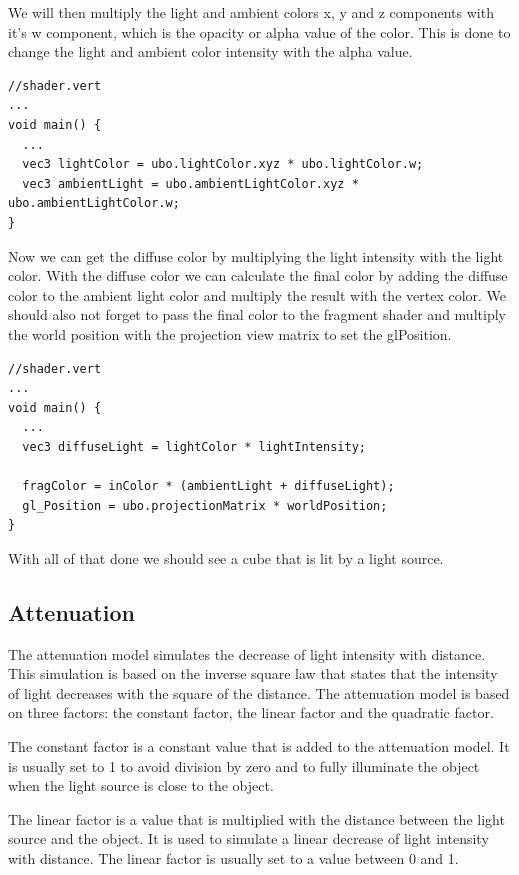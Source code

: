 \documentclass[12pt]{report} \usepackage{preamble}
\begin{document}
We will then multiply the light and ambient colors x, y and z components with it's w component, which is the
opacity or alpha value of the color. This is done to change the light and ambient color intensity with the alpha value.

\begin{lstlisting}[Language=C++]
//shader.vert
...
void main() {
  ...
  vec3 lightColor = ubo.lightColor.xyz * ubo.lightColor.w;
  vec3 ambientLight = ubo.ambientLightColor.xyz * ubo.ambientLightColor.w;
}
\end{lstlisting}

Now we can get the diffuse color by multiplying the light intensity with the light color.
With the diffuse color we can calculate the final color by adding the diffuse color to the ambient light color and multiply the result with the vertex color.
We should also not forget to pass the final color to the fragment shader and multiply the world position with the projection view matrix
to set the gl\textunderscore Position.

\begin{lstlisting}[Language=C++]
//shader.vert
...
void main() {
  ...
  vec3 diffuseLight = lightColor * lightIntensity;

  fragColor = inColor * (ambientLight + diffuseLight);
  gl_Position = ubo.projectionMatrix * worldPosition;
}
\end{lstlisting}

With all of that done we should see a cube that is lit by a light source.

\subsection{Attenuation}

The attenuation model simulates the decrease of light intensity with distance.
This simulation is based on the inverse square law that states that the intensity of light decreases with the square of the distance.
The attenuation model is based on three factors: the constant factor, the linear factor and the quadratic factor.

The constant factor is a constant value that is added to the attenuation model.
It is usually set to 1 to avoid division by zero and to fully illuminate the object when the light source is close to the object.

The linear factor is a value that is multiplied with the distance between the light source and the object.
It is used to simulate a linear decrease of light intensity with distance. The linear factor is usually set to a value between 0 and 1.
\end{document}
